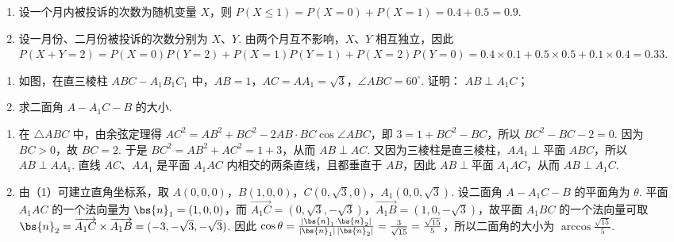 \begin{solution}
\begin{enumerate}
\item 设一个月内被投诉的次数为随机变量 \(X\)，则 \(P(X\leqslant 1)=P(X=0)+P(X=1)=0.4+0.5=0.9\).
\item 设一月份、二月份被投诉的次数分别为 \(X\)、\(Y\). 由两个月互不影响，\(X\)、\(Y\) 相互独立，因此 \(P(X+Y=2)=P(X=0)P(Y=2)+P(X=1)P(Y=1)+P(X=2)P(Y=0)=0.4\times0.1+0.5\times0.5+0.1\times0.4=0.33\).
\end{enumerate}
\end{solution}

\begin{problem}
\begin{enumerate}
\item 如图，在直三棱柱 \(ABC - A_{1}B_{1}C_{1}\) 中，\(AB = 1\)，\(AC = AA_{1} = \sqrt{3}\)，\(\angle ABC = 60^{\circ}\). 证明： \( AB \perp A_{1}C \)；
\item 求二面角 \(A - A_{1}C - B\) 的大小.
\end{enumerate}

\end{problem}

\begin{solution}
\begin{enumerate}
\item 在 \(\triangle ABC\) 中，由余弦定理得 \(AC^{2}=AB^{2}+BC^{2}-2AB\cdot BC\cos\angle ABC\)，即 \(3=1+BC^{2}-BC\)，所以 \(BC^{2}-BC-2=0\). 因为 \(BC>0\)，故 \(BC=2\). 于是 \(BC^{2}=AB^{2}+AC^{2}=1+3\)，从而 \(AB\perp AC\). 又因为三棱柱是直三棱柱，\(AA_{1}\perp\text{平面 }ABC\)，所以 \(AB\perp AA_{1}\). 直线 \(AC\)、\(AA_{1}\) 是平面 \(A_{1}AC\) 内相交的两条直线，且都垂直于 \(AB\)，因此 \(AB\perp\text{平面 }A_{1}AC\)，从而 \(AB\perp A_{1}C\).
\item 由（1）可建立直角坐标系，取 \(A(0,0,0)\)，\(B(1,0,0)\)，\(C(0,\sqrt{3},0)\)，\(A_{1}(0,0,\sqrt{3})\). 设二面角 \(A-A_{1}C-B\) 的平面角为 \(\theta\). 平面 \(A_{1}AC\) 的一个法向量为 \(\bs{n}_{1}=(1,0,0)\)，而 \(\overrightarrow{A_{1}C}=(0,\sqrt{3},-\sqrt{3})\)，\(\overrightarrow{A_{1}B}=(1,0,-\sqrt{3})\)，故平面 \(A_{1}BC\) 的一个法向量可取 \(\bs{n}_{2}=\overrightarrow{A_{1}C}\times\overrightarrow{A_{1}B}=(-3,-\sqrt{3},-\sqrt{3})\). 因此 \(\cos\theta=\frac{|\bs{n}_{1}\cdot\bs{n}_{2}|}{|\bs{n}_{1}|\,|\bs{n}_{2}|}=\frac{3}{\sqrt{15}}=\frac{\sqrt{15}}{5}\)，所以二面角的大小为 \(\arccos\frac{\sqrt{15}}{5}\).
\end{enumerate}
\end{solution}

